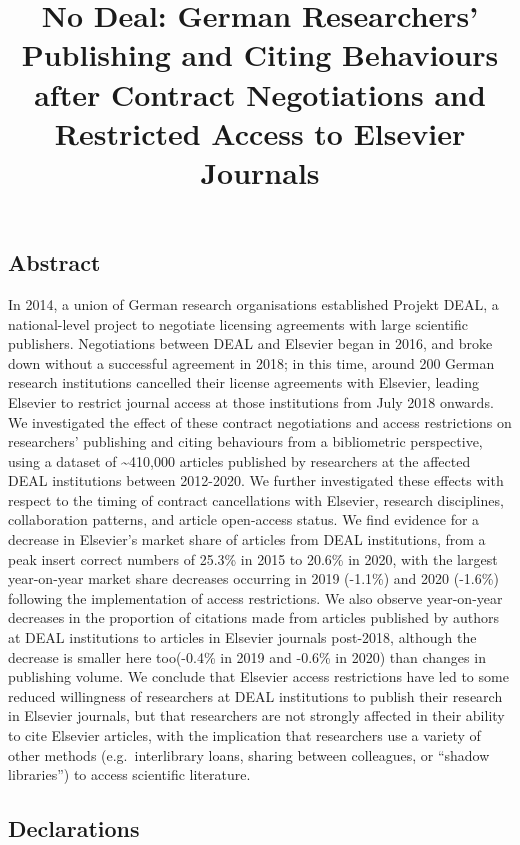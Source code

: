 \documentclass[
]{article}
\title{No Deal: German Researchers' Publishing and Citing Behaviours after Contract Negotiations and Restricted Access to Elsevier Journals}
\author{}
\date{\vspace{-2.5em}}
\begin{document}
\maketitle

\hypertarget{abstract}{%
\subsection{Abstract}\label{abstract}}

In 2014, a union of German research organisations established Projekt DEAL, a national-level project to negotiate licensing agreements with large scientific publishers. Negotiations between DEAL and Elsevier began in 2016, and broke down without a successful agreement in 2018; in this time, around 200 German research institutions cancelled their license agreements with Elsevier, leading Elsevier to restrict journal access at those institutions from July 2018 onwards. We investigated the effect of these contract negotiations and access restrictions on researchers' publishing and citing behaviours from a bibliometric perspective, using a dataset of \textasciitilde410,000 articles published by researchers at the affected DEAL institutions between 2012-2020. We further investigated these effects with respect to the timing of contract cancellations with Elsevier, research disciplines, collaboration patterns, and article open-access status. We find evidence for a decrease in Elsevier's market share of articles from DEAL institutions, from a peak insert correct numbers of 25.3\% in 2015 to 20.6\% in 2020, with the largest year-on-year market share decreases occurring in 2019 (-1.1\%) and 2020 (-1.6\%) following the implementation of access restrictions. We also observe year-on-year decreases in the proportion of citations made from articles published by authors at DEAL institutions to articles in Elsevier journals post-2018, although the decrease is smaller here too(-0.4\% in 2019 and -0.6\% in 2020) than changes in publishing volume. We conclude that Elsevier access restrictions have led to some reduced willingness of researchers at DEAL institutions to publish their research in Elsevier journals, but that researchers are not strongly affected in their ability to cite Elsevier articles, with the implication that researchers use a variety of other methods (e.g.~interlibrary loans, sharing between colleagues, or ``shadow libraries'') to access scientific literature.

\hypertarget{declarations}{%
\subsection{Declarations}\label{declarations}}
\end{document}
